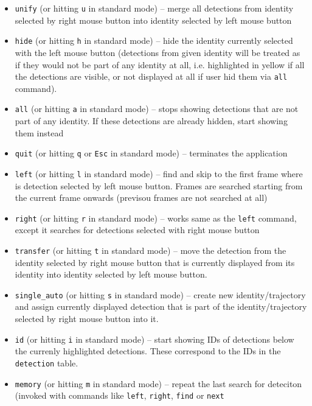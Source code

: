 \begin{itemize}
    \item \verb+unify+ (or hitting \verb+u+ in standard mode) -- merge all detections
    from identity selected by right mouse button into identity selected by left mouse 
    button
    \item \verb+hide+ (or hitting \verb+h+ in standard mode) -- hide the identity
    currently selected with the left mouse button (detections from given identity
    will be treated as if they would not be part of any identity at all, i.e.
    highlighted in yellow if all the detections are visible, or not displayed at all
    if user hid them via \verb+all+ command).
    \item \verb+all+ (or hitting \verb+a+ in standard mode) -- stops showing detections
    that are not part of any identity. If these detections are already hidden, start
    showing them instead
    \item \verb+quit+ (or hitting \verb+q+ or \verb+Esc+ in standard mode) -- terminates
    the application
    \item \verb+left+ (or hitting \verb+l+ in standard mode) -- find and skip to the
    first frame where is detection selected by left mouse button. Frames are searched
    starting from the current frame onwards (previsou frames are not searched at all)
    \item \verb+right+ (or hitting \verb+r+ in standard mode) -- works same as the 
    \verb+left+ command, except it searches for detections selected with right mouse
    button
    \item \verb+transfer+ (or hitting \verb+t+ in standard mode) -- move the detection
    from the identity selected by right mouse button that is currently displayed from
    its identity into identity selected by left mouse button.
    \item \verb+single_auto+ (or hitting \verb+s+ in standard mode) -- create new
    identity/trajectory and assign currently displayed detection that is part of the
    identity/trajectory selected by right mouse button into it.
    \item \verb+id+ (or hitting \verb+i+ in standard mode) -- start showing IDs of
    detections below the currenly highlighted detections. These correspond to the IDs
    in the \texttt{detection} table.
    \item \verb+memory+ (or hitting \verb+m+ in standard mode) -- repeat the last search 
    for deteciton (invoked with commands
    like \verb+left+, \verb+right+, \verb+find+ or \verb+next+

\end{itemize}
